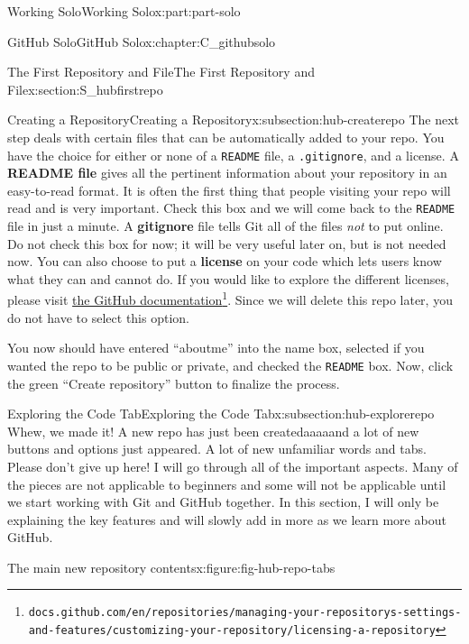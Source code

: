 \documentclass[oneside,10pt,]{book}
\newcommand{\mono}[1]{\texttt{#1}}
\newcommand{\terminology}[1]{\textbf{#1}}
\begin{document}
\begin{partptx}{Working Solo}{}{Working Solo}{}{}{x:part:part-solo}
\begin{chapterptx}{GitHub Solo}{}{GitHub Solo}{}{}{x:chapter:C_githubsolo}
\begin{sectionptx}{The First Repository and File}{}{The First Repository and File}{}{}{x:section:S_hubfirstrepo}
\begin{subsectionptx}{Creating a Repository}{}{Creating a Repository}{}{}{x:subsection:hub-createrepo}
 The next step deals with certain files that can be automatically added to your repo. You have the choice for either or none of a \mono{README} file, a \mono{.gitignore}, and a license. A \terminology{README file} gives all the pertinent information about your repository in an easy-to-read format. It is often the first thing that people visiting your repo will read and is very important. Check this box and we will come back to the \mono{README} file in just a minute. A \terminology{gitignore} file tells Git all of the files \emph{not} to put online. Do not check this box for now; it will be very useful later on, but is not needed now. You can also choose to put a \terminology{license} on your code which lets users know what they can and cannot do. If you would like to explore the different licenses, please visit \href{https://docs.github.com/en/repositories/managing-your-repositorys-settings-and-features/customizing-your-repository/licensing-a-repository}{the GitHub documentation}\footnote{\nolinkurl{docs.github.com/en/repositories/managing-your-repositorys-settings-and-features/customizing-your-repository/licensing-a-repository}\label{g:fn:idm480274776}}. Since we will delete this repo later, you do not have to select this option.%
\par
You now should have entered ``aboutme'' into the name box, selected if you wanted the repo to be public or private, and checked the \mono{README} box. Now, click the green ``Create repository'' button to finalize the process.%
\end{subsectionptx}
%
%
\typeout{************************************************}
\typeout{************************************************}
%
\begin{subsectionptx}{Exploring the Code Tab}{}{Exploring the Code Tab}{}{}{x:subsection:hub-explorerepo}
%
Whew, we made it! A new repo has just been created\textellipsis{}aaaaand a lot of new buttons and options just appeared. A lot of new unfamiliar words and tabs. Please don't give up here! I will go through all of the important aspects. Many of the pieces are not applicable to beginners and some will not be applicable until we start working with Git and GitHub together. In this section, I will only be explaining the key features and will slowly add in more as we learn more about GitHub.%
\begin{figureptx}{The main new repository contents}{x:figure:fig-hub-repo-tabs}{}%
\begin{image}{0.1}{0.8}{0.1}%

\end{image}
\end{figureptx}
\end{subsectionptx}
\end{sectionptx}
\end{chapterptx}
\end{partptx}
\end{document}
